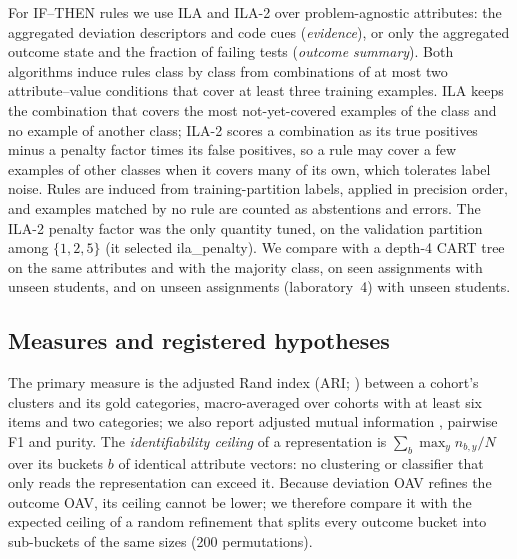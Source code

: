 For IF--THEN rules we use ILA \citep{tolun1998ila} and ILA-2 \citep{tolun1999ila2} over problem-agnostic attributes: the aggregated deviation descriptors and code cues (\emph{evidence}), or only the aggregated outcome state and the fraction of failing tests (\emph{outcome summary}). Both algorithms induce rules class by class from combinations of at most two attribute--value conditions that cover at least three training examples. ILA keeps the combination that covers the most not-yet-covered examples of the class and no example of another class; ILA-2 scores a combination as its true positives minus a penalty factor times its false positives, so a rule may cover a few examples of other classes when it covers many of its own, which tolerates label noise. Rules are induced from training-partition labels, applied in precision order, and examples matched by no rule are counted as abstentions and errors. The ILA-2 penalty factor was the only quantity tuned, on the validation partition among $\{1,2,5\}$ (it selected {{ila_penalty}}). We compare with a depth-4 CART tree on the same attributes and with the majority class, on seen assignments with unseen students, and on unseen assignments (laboratory~4) with unseen students.

\subsection{Measures and registered hypotheses}\label{sec:hyp}
The primary measure is the adjusted Rand index (ARI; \citealt{hubert1985ari}) between a cohort's clusters and its gold categories, macro-averaged over cohorts with at least six items and two categories; we also report adjusted mutual information \citep{vinh2010ami}, pairwise F1 and purity. The \emph{identifiability ceiling} of a representation is $\sum_b \max_y n_{b,y}/N$ over its buckets $b$ of identical attribute vectors: no clustering or classifier that only reads the representation can exceed it. Because deviation OAV refines the outcome OAV, its ceiling cannot be lower; we therefore compare it with the expected ceiling of a random refinement that splits every outcome bucket into sub-buckets of the same sizes (200 permutations).

